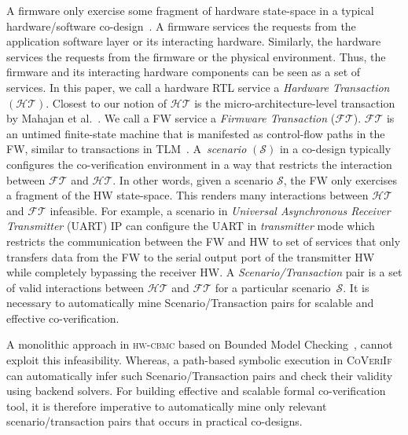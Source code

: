 \documentclass[sigconf]{acmart}
\newcommand{\tool}[1]{\textsc{#1}\xspace}
\newcommand{\hwcbmcv}{\tool{hw-cbmc}}
\newcommand{\verifox}{\tool{CoVeriIf}}
\begin{document}
A firmware only exercise some fragment of hardware state-space in a typical 
hardware/software co-design~\cite{dac17,taa,ibm-other}.  
A firmware services the requests from the application software 
layer or its interacting hardware.  Similarly, the hardware services 
the requests from the firmware or the
physical environment.  Thus, the firmware and its interacting hardware
components can be seen as a set of services.  In this paper, we call a
hardware RTL service a {\em Hardware Transaction} $(\mathcal{HT})$.  Closest
to our notion of $\mathcal{HT}$ is the micro-architecture-level transaction
by Mahajan et al.~\cite{mcbmq}.  We call a FW service a {\em Firmware
Transaction} ($\mathcal{FT}$).  $\mathcal{FT}$ is an untimed finite-state
machine that is manifested as control-flow paths in the FW, similar to
transactions in TLM~\cite{codes14}.  A~{\em scenario} $(\mathcal{S})$ in a
co-design typically configures the co-verification environment in a way that
restricts the interaction between $\mathcal{FT}$ and $\mathcal{HT}$.  In
other words, given a scenario $\mathcal{S}$, the FW only exercises a fragment
of the HW state-space.  This renders many interactions between
$\mathcal{HT}$ and $\mathcal{FT}$ infeasible. For example, a scenario in 
\emph{Universal Asynchronous Receiver Transmitter} (UART) IP can configure the 
UART in \emph{transmitter} mode which restricts the communication between the FW 
and HW to set of services that only transfers data from the FW to the serial output 
port of the transmitter HW while completely bypassing the receiver HW.  
A {\em Scenario/Transaction} pair is a set of valid interactions between 
$\mathcal{HT}$ and $\mathcal{FT}$ for a particular scenario~$\mathcal{S}$.  
It is necessary to automatically mine Scenario/Transaction pairs for scalable 
and effective co-verification.

A monolithic approach in \hwcbmcv based on Bounded Model Checking~\cite{CKY03}, 
cannot exploit this infeasibility.  Whereas, a path-based symbolic execution in 
\verifox can automatically infer such Scenario/Transaction pairs and check their 
validity using backend solvers.  For building effective and scalable formal 
co-verification tool, it is therefore imperative to automatically mine only 
relevant scenario/transaction pairs that occurs in practical co-designs. 
\end{document}
